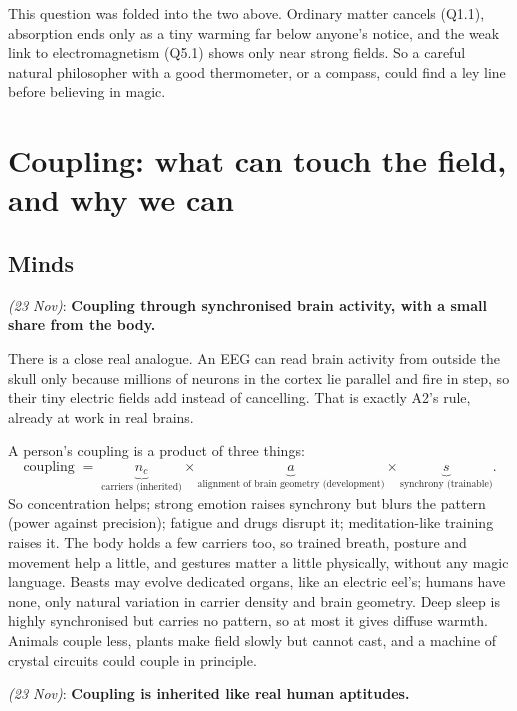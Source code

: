 \documentclass[11pt,a4paper]{article}
\newcommand{\decision}[3]{\par\smallskip\noindent{\color{dec}\textbf{Decision #1}} \textit{(#2)}: \textbf{#3}\par}
\begin{document}
This question was folded into the two above. Ordinary matter cancels (Q1.1), absorption ends only as a tiny warming far below anyone's notice, and the weak link to electromagnetism (Q5.1) shows only near strong fields. So a careful natural philosopher with a good thermometer, or a compass, could find a ley line before believing in magic.

\section{Coupling: what can touch the field, and why we can}\label{sec:coupling}

\subsection{Minds}

\decision{Q2.1}{23 Nov}{Coupling through synchronised brain activity, with a small share from the body.}

There is a close real analogue. An EEG can read brain activity from outside the skull only because millions of neurons in the cortex lie parallel and fire in step, so their tiny electric fields add instead of cancelling. That is exactly A2's rule, already at work in real brains.

A person's coupling is a product of three things:
\begin{equation}
  \text{coupling} \;=\; \underbrace{n_c}_{\text{carriers (inherited)}} \times \underbrace{a}_{\text{alignment of brain geometry (development)}} \times \underbrace{s}_{\text{synchrony (trainable)}}.
\end{equation}
So concentration helps; strong emotion raises synchrony but blurs the pattern (power against precision); fatigue and drugs disrupt it; meditation-like training raises it. The body holds a few carriers too, so trained breath, posture and movement help a little, and gestures matter a little physically, without any magic language. Beasts may evolve dedicated organs, like an electric eel's; humans have none, only natural variation in carrier density and brain geometry. Deep sleep is highly synchronised but carries no pattern, so at most it gives diffuse warmth. Animals couple less, plants make field slowly but cannot cast, and a machine of crystal circuits could couple in principle.

\decision{Q2.3}{23 Nov}{Coupling is inherited like real human aptitudes.}
\end{document}
